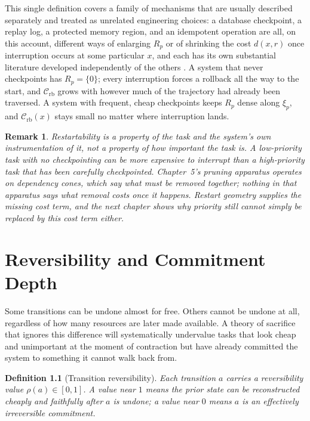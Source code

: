 \documentclass[11pt]{report}
\newtheorem{definition}{Definition}[chapter]
\newtheorem{remark}[definition]{Remark}
\begin{document}
This single definition covers a family of mechanisms that are usually described separately and treated as unrelated engineering choices: a database checkpoint, a replay log, a protected memory region, and an idempotent operation are all, on this account, different ways of enlarging $R_p$ or of shrinking the cost $d(x,r)$ once interruption occurs at some particular $x$, and each has its own substantial literature developed independently of the others \cite{chandy1985,elnozahy2002,young1974,daley2005,randell1975}. A system that never checkpoints has $R_p = \{0\}$; every interruption forces a rollback all the way to the start, and $\mathcal C_{\mathrm{rb}}$ grows with however much of the trajectory had already been traversed. A system with frequent, cheap checkpoints keeps $R_p$ dense along $\xi_p$, and $\mathcal C_{\mathrm{rb}}(x)$ stays small no matter where interruption lands.

\begin{remark}
Restartability is a property of the task and the system's own instrumentation of it, not a property of how important the task is. A low-priority task with no checkpointing can be more expensive to interrupt than a high-priority task that has been carefully checkpointed. Chapter~5's pruning apparatus operates on dependency cones, which say what must be removed together; nothing in that apparatus says what removal costs once it happens. Restart geometry supplies the missing cost term, and the next chapter shows why priority still cannot simply be replaced by this cost term either.
\end{remark}

\chapter{Reversibility and Commitment Depth}

Some transitions can be undone almost for free. Others cannot be undone at all, regardless of how many resources are later made available. A theory of sacrifice that ignores this difference will systematically undervalue tasks that look cheap and unimportant at the moment of contraction but have already committed the system to something it cannot walk back from.

\begin{definition}[Transition reversibility]
Each transition $a$ carries a reversibility value $\rho(a) \in [0,1]$. A value near $1$ means the prior state can be reconstructed cheaply and faithfully after $a$ is undone; a value near $0$ means $a$ is an effectively irreversible commitment.
\end{definition}
\end{document}
